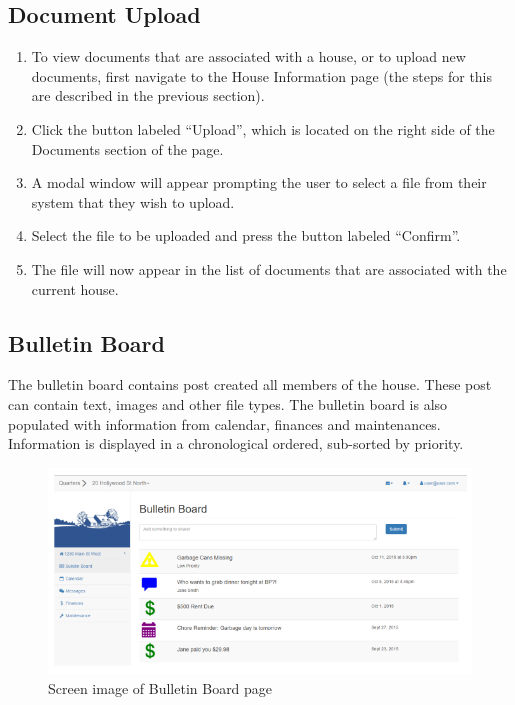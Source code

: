 \documentclass[12pt]{article}
\begin{document}
    \subsection{Document Upload} %
    \begin{enumerate}
        \item To view documents that are associated with a house, or to upload new documents, first navigate to the House Information page (the steps for this are described in the previous section).
        \item Click the button labeled ``Upload'', which is located on the right side of the Documents section of the page.
        \item A modal window will appear prompting the user to select a file from their system that they wish to upload.
        \item Select the file to be uploaded and press the button labeled ``Confirm''.
        \item The file will now appear in the list of documents that are associated with the current house.
    \end{enumerate}

    \subsection{Bulletin Board}
    The bulletin board contains post created all members of the house. These post can contain text, images and other file types.
    The bulletin board is also populated with information from calendar, finances and maintenances.
    Information is displayed in a chronological ordered, sub-sorted by priority.

    \begin{figure}
        \centering
        \includegraphics[width=\textwidth]{bulletin}
        \caption{Screen image of Bulletin Board page}
        \label{fig:bulletin}
    \end{figure}
\end{document}
